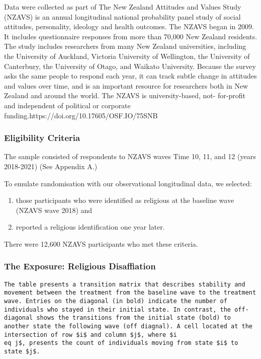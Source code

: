 \documentclass[
  singlecolumn,
  9pt]{article}
\providecommand{\tightlist}{%
  \setlength{\itemsep}{0pt}\setlength{\parskip}{0pt}}\usepackage{longtable,booktabs,array}
\begin{document}
Data were collected as part of The New Zealand Attitudes and Values
Study (NZAVS) is an annual longitudinal national probability panel study
of social attitudes, personality, ideology and health outcomes. The
NZAVS began in 2009. It includes questionnaire responses from more than
70,000 New Zealand residents. The study includes researchers from many
New Zealand universities, including the University of Auckland, Victoria
University of Wellington, the University of Canterbury, the University
of Otago, and Waikato University. Because the survey asks the same
people to respond each year, it can track subtle change in attitudes and
values over time, and is an important resource for researchers both in
New Zealand and around the world. The NZAVS is university-based, not-
for-profit and independent of political or corporate
funding.https://doi.org/10.17605/OSF.IO/75SNB

\subsubsection{Eligibility Criteria}\label{eligibility-criteria}

The sample consisted of respondents to NZAVS waves Time 10, 11, and 12
(years 2018-2021) (See Appendix A.)

To emulate randomisation with our observational longitudinal data, we
selected:

\begin{enumerate}
\def\labelenumi{\arabic{enumi}.}
\tightlist
\item
  those participants who were identified as religious at the baseline
  wave (NZAVS wave 2018) and
\item
  reported a religious identification one year later.
\end{enumerate}

There were 12,600 NZAVS participants who met these criteria.

\subsubsection{The Exposure: Religious
Disaffiation}\label{the-exposure-religious-disaffiation}

\begin{verbatim}
The table presents a transition matrix that describes stability and movement between the treatment from the baseline wave to the treatment wave. Entries on the diagonal (in bold) indicate the number of individuals who stayed in their initial state. In contrast, the off-diagonal shows the transitions from the initial state (bold) to another state the following wave (off diagnal). A cell located at the intersection of row $i$ and column $j$, where $i 
eq j$, presents the count of individuals moving from state $i$ to state $j$.
\end{verbatim}
\end{document}
